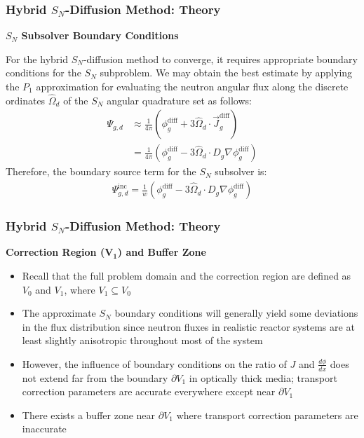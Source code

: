 \begin{frame}
  \frametitle{Hybrid $S_N$-Diffusion Method: Theory}
  \textbf{$S_N$ Subsolver Boundary Conditions}
  \vspace{.2cm}

  For the hybrid $S_N$-diffusion method to converge, it requires appropriate boundary conditions for
  the $S_N$ subproblem.
  We may obtain
  the best estimate by applying the $P_1$ approximation for evaluating the neutron angular flux along
  the discrete ordinates $\hat{\Omega}_d$ of the $S_N$ angular quadrature set as follows:
  \begin{align}
    \Psi_{g,d} &\approx \frac{1}{4\pi}\left(\phi^\text{diff}_g+3\hat{\Omega}_d\cdot
    \vec{J}^\text{diff}_g\right) \nonumber \\
    &=\frac{1}{4\pi}\left(\phi^\text{diff}_g-3\hat{\Omega}_d\cdot D_g\nabla\phi^\text{diff}_g\right)
  \end{align}
  Therefore, the boundary source term for the $S_N$ subsolver is:
  \begin{gather}
    \Psi^\text{inc}_{g,d} = \frac{1}{w}
    \left(\phi^\text{diff}_g-3\hat{\Omega}_d\cdot D_g\nabla\phi^\text{diff}_g\right)
  \end{gather}
\end{frame}

\begin{frame}
  \frametitle{Hybrid $S_N$-Diffusion Method: Theory}
  \textbf{Correction Region ($\bm{V_1}$) and Buffer Zone}
  \begin{itemize}
    \item Recall that the full problem domain and the correction region are defined as $V_0$
      and $V_1$, where $V_1 \subseteq V_0$
    \item The approximate $S_N$ boundary conditions will generally yield some deviations in the
      flux distribution since neutron fluxes in realistic reactor systems are at least slightly
      anisotropic throughout most of the system
    \item However, the influence of boundary conditions on the ratio of $J$ and $\frac{d\phi}{dx}$
      does not extend far from the boundary $\partial V_1$ in optically thick media; transport
      correction parameters are accurate everywhere except near $\partial V_1$
    \item There exists a buffer zone near $\partial V_1$ where transport correction parameters
      are inaccurate
  \end{itemize}
\end{frame}

